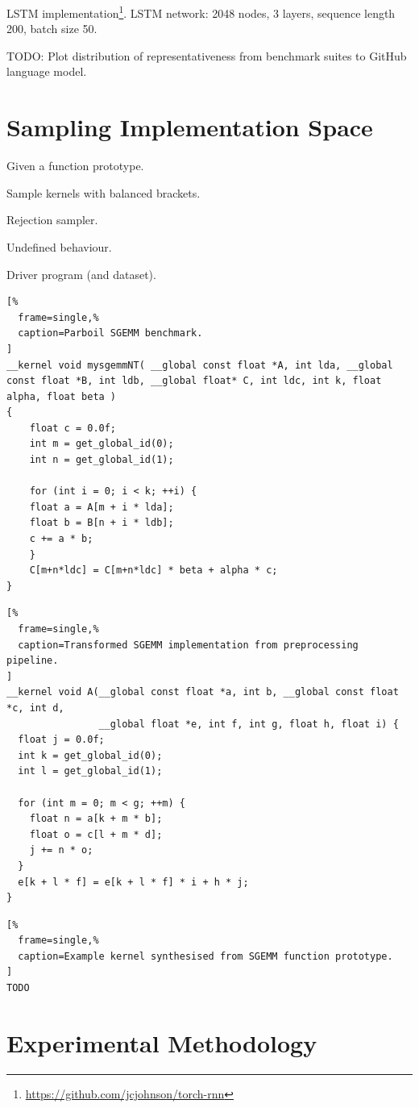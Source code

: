 \documentclass[preprint,nonatbib,10pt,nocopyrightspace]{sigplanconf}
\begin{document}
LSTM
implementation\footnote{\url{https://github.com/jcjohnson/torch-rnn}}. LSTM
network: 2048 nodes, 3 layers, sequence length 200, batch size 50.

TODO: Plot distribution of representativeness from benchmark suites to
GitHub language model.


\section{Sampling Implementation Space}\label{sec:}

Given a function prototype.

Sample kernels with balanced brackets.

Rejection sampler.

Undefined behaviour.

Driver program (and dataset).

\lstset{language=[OpenCL]C}
\begin{lstlisting}[%
  frame=single,%
  caption=Parboil SGEMM benchmark.
]
__kernel void mysgemmNT( __global const float *A, int lda, __global const float *B, int ldb, __global float* C, int ldc, int k, float alpha, float beta )
{
    float c = 0.0f;
    int m = get_global_id(0);
    int n = get_global_id(1);

    for (int i = 0; i < k; ++i) {
	float a = A[m + i * lda];
	float b = B[n + i * ldb];
	c += a * b;
    }
    C[m+n*ldc] = C[m+n*ldc] * beta + alpha * c;
}
\end{lstlisting}


\lstset{language=[OpenCL]C}
\begin{lstlisting}[%
  frame=single,%
  caption=Transformed SGEMM implementation from preprocessing pipeline.
]
__kernel void A(__global const float *a, int b, __global const float *c, int d,
                __global float *e, int f, int g, float h, float i) {
  float j = 0.0f;
  int k = get_global_id(0);
  int l = get_global_id(1);

  for (int m = 0; m < g; ++m) {
    float n = a[k + m * b];
    float o = c[l + m * d];
    j += n * o;
  }
  e[k + l * f] = e[k + l * f] * i + h * j;
}
\end{lstlisting}


\lstset{language=[OpenCL]C}
\begin{lstlisting}[%
  frame=single,%
  caption=Example kernel synthesised from SGEMM function prototype.
]
TODO
\end{lstlisting}


\section{Experimental Methodology}\label{sec:evaluation}
\end{document}
